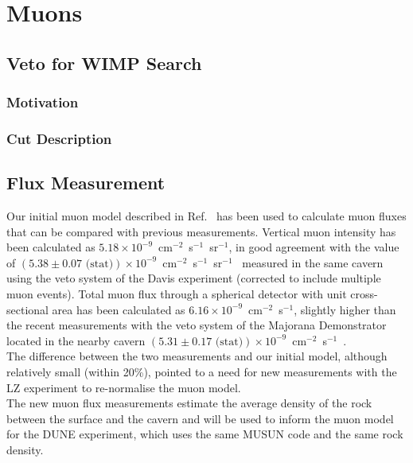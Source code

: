 \chapter{Muons}
\section{Veto for WIMP Search}
\subsection{Motivation}

\subsection{Cut Description}

\section{Flux Measurement}
Our initial muon model described in Ref.~\cite{LZ_SIMS} has been used to calculate muon fluxes that can be compared with previous measurements. Vertical muon intensity has been calculated as $5.18\times10^{-9}$~cm$^{-2}$~s$^{-1}$~sr$^{-1}$, in good agreement with the value of $(5.38\pm0.07\text{ (stat)})\times10^{-9}$~cm$^{-2}$~s$^{-1}$~sr$^{-1}$~\cite{Cherry} measured in the same cavern using the veto system of the Davis experiment (corrected to include multiple muon events). Total muon flux through a spherical detector with unit cross-sectional area has been calculated as $6.16\times10^{-9}$~cm$^{-2}$~s$^{-1}$, slightly higher than the recent measurements with the veto system of the Majorana Demonstrator located in the nearby cavern $(5.31\pm0.17 \text{ (stat)})\times10^{-9}$~cm$^{-2}$~s$^{-1}$~\cite{majorana}.\\
The difference between the two measurements and our initial model, although relatively small (within 20\%), pointed to a need for new measurements with the LZ experiment to re-normalise the muon model.\\
The new muon flux measurements estimate the average density of the rock between the surface and the cavern and will be used to inform the muon model for the DUNE experiment\cite{DUNE}, which uses the same MUSUN code and the same rock density.
